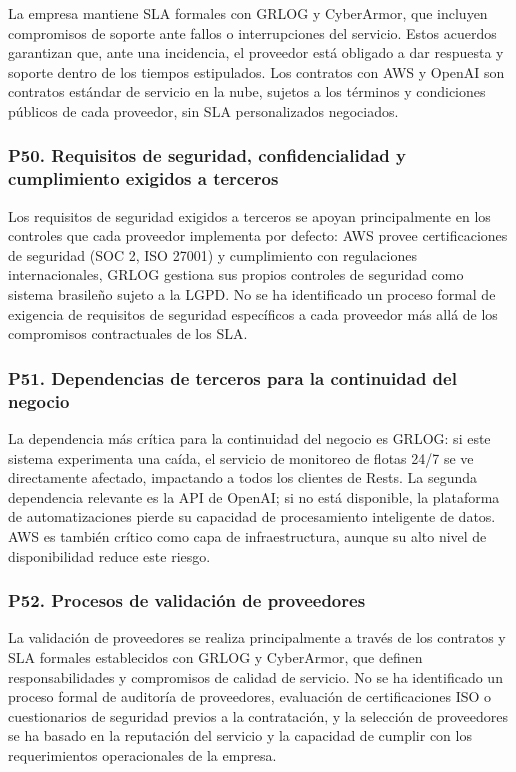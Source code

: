 \documentclass[12pt]{article}
\begin{document}
La empresa mantiene SLA formales con GRLOG y CyberArmor, que incluyen compromisos
de soporte ante fallos o interrupciones del servicio. Estos acuerdos garantizan que, ante
una incidencia, el proveedor est\'a obligado a dar respuesta y soporte dentro de los tiempos
estipulados. Los contratos con AWS y OpenAI son contratos est\'andar de servicio en la nube,
sujetos a los t\'erminos y condiciones p\'ublicos de cada proveedor, sin SLA personalizados
negociados.

\subsubsection*{\textbf{P50. Requisitos de seguridad, confidencialidad y cumplimiento exigidos a terceros}}

Los requisitos de seguridad exigidos a terceros se apoyan principalmente en los controles
que cada proveedor implementa por defecto: AWS provee certificaciones de seguridad (SOC 2,
ISO 27001) y cumplimiento con regulaciones internacionales, GRLOG gestiona sus propios
controles de seguridad como sistema brasile\~no sujeto a la LGPD. No se ha identificado
un proceso formal de exigencia de requisitos de seguridad espec\'ificos a cada proveedor
m\'as all\'a de los compromisos contractuales de los SLA.

\subsubsection*{\textbf{P51. Dependencias de terceros para la continuidad del negocio}}

La dependencia m\'as cr\'itica para la continuidad del negocio es GRLOG: si este
sistema experimenta una ca\'ida, el servicio de monitoreo de flotas 24/7 se ve directamente
afectado, impactando a todos los clientes de Rests. La segunda dependencia relevante es la
API de OpenAI; si no est\'a disponible, la plataforma de automatizaciones pierde
su capacidad de procesamiento inteligente de datos. AWS es tambi\'en cr\'itico como capa
de infraestructura, aunque su alto nivel de disponibilidad reduce este riesgo.

\subsubsection*{\textbf{P52. Procesos de validaci\'on de proveedores}}

La validaci\'on de proveedores se realiza principalmente a trav\'es de los contratos
y SLA formales establecidos con GRLOG y CyberArmor, que definen responsabilidades y
compromisos de calidad de servicio. No se ha identificado un proceso formal de auditor\'ia
de proveedores, evaluaci\'on de certificaciones ISO o cuestionarios de seguridad previos
a la contrataci\'on, y la selecci\'on de proveedores se ha basado en la reputaci\'on del
servicio y la capacidad de cumplir con los requerimientos operacionales de la empresa.
\end{document}
